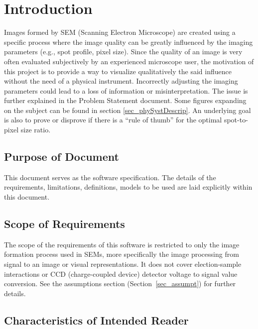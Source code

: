 \documentclass[12pt]{article}
\begin{document}
\newpage


\section{Introduction}

Images formed by SEM (Scanning Electron Microscope) are created using a 
specific process where the image quality can be greatly influenced by the 
imaging parameters (e.g., spot profile, pixel size). Since the quality of 
an image is very often evaluated subjectively by an experienced microscope 
user, the motivation of this project is to provide a way to visualize 
qualitatively the said influence without the need of a physical instrument.
Incorrectly adjusting the imaging parameters could lead to a loss of information 
or misinterpretation. The issue is further explained in the 
Problem Statement document. Some figures expanding on the subject can be
found in section \ref{sec_phySystDescrip}.
An underlying goal is also to prove or disprove if 
there is a ``rule of thumb'' for the optimal spot-to-pixel size ratio.

\subsection{Purpose of Document}

This document serves as the software specification. The details of the 
requirements, limitations, definitions, models to be used are laid explicitly 
within this document.

\subsection{Scope of Requirements} 

The scope of the requirements of this software is restricted to only the image 
formation process used in SEMs, more specifically the image processing from 
signal to an image or visual representations. It does not cover election-sample 
interactions or CCD (charge-coupled device) detector voltage to signal value 
conversion. See the assumptions section (Section~\ref{sec_assumpt}) for further 
details.

\subsection{Characteristics of Intended Reader} \label{sec_IntendedReader}
\end{document}
